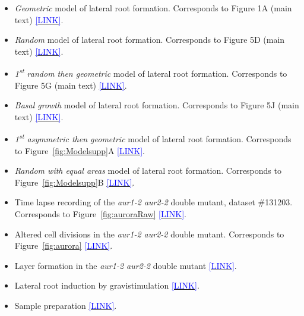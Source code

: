 \documentclass[11pt,a4paper, final]{article}
\newenvironment{Itemize}{
 \begin{itemize}[leftmargin=0.5cm]{
}}{\end{itemize}}
\begin{document}
\begin{Itemize}
\begin{Itemize}
    \item Dataset \#121204 \href{http://youtu.be/Bd_UgUVyzrM}{\textcolor{blue}{[LINK]}}.
    \item Dataset \#121211 \href{http://youtu.be/NOouEVqpGj8}{\textcolor{blue}{[LINK]}}.
    \item Dataset \#130508 \href{http://youtu.be/EajarNlRvtA}{\textcolor{blue}{[LINK]}}.
  \end{Itemize}
  \item \emph{Geometric} model of lateral root formation. Corresponds to Figure 1A (main text) \href{https://youtu.be/1bVEY_ORSfI}{\textcolor{blue}{[LINK]}}.
  \item \emph{Random} model of lateral root formation. Corresponds to Figure 5D (main text) \href{https://youtu.be/So1GQrtu41w}{\textcolor{blue}{[LINK]}}.
  \item \emph{1\textsuperscript{st} random then geometric} model of lateral root formation. Corresponds to Figure 5G (main text)
  \href{https://youtu.be/H6RUvnqBTVA}{\textcolor{blue}{[LINK]}}.
  \item \emph{Basal growth} model of lateral root formation. Corresponds to Figure 5J (main text) \href{https://youtu.be/TZqwYTnmAgg}{\textcolor{blue}{[LINK]}}.
  \item \emph{1\textsuperscript{st} asymmetric then geometric} model of lateral root formation. Corresponds to Figure~\ref{fig:Modelsupp}A \href{https://youtu.be/ypBdyjFyqYw}{\textcolor{blue}{[LINK]}}.
  \item \emph{Random with equal areas} model of lateral root formation. Corresponds to Figure~\ref{fig:Modelsupp}B
  \href{https://youtu.be/gB-Qt0_H1ok}{\textcolor{blue}{[LINK]}}.
  \item Time lapse recording of the \emph{aur1-2 aur2-2} double mutant, dataset \#131203. Corresponds to Figure~\ref{fig:auroraRaw} \href{http://youtu.be/y8b-0J4lPHg}{\textcolor{blue}{[LINK]}}.
  \item Altered cell divisions in the \emph{aur1-2 aur2-2} double mutant. Corresponds to Figure~\ref{fig:aurora} \href{http://youtu.be/kkQZub-puVI}{\textcolor{blue}{[LINK]}}.
  \item Layer formation in the \emph{aur1-2 aur2-2} double mutant \href{http://youtu.be/FH5BJ177TGk}{\textcolor{blue}{[LINK]}}.
  \item Lateral root induction by gravistimulation \href{http://youtu.be/sLvVCbWye-E}{\textcolor{blue}{[LINK]}}.
  \item Sample preparation \href{https://youtu.be/uFdOIjmO9vI}{\textcolor{blue}{[LINK]}}.
\end{Itemize}
\end{document}
